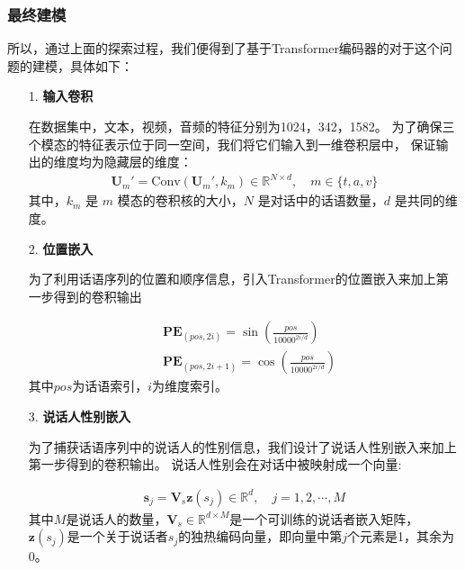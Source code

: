\documentclass[11pt]{article}
\begin{document}
            \subsubsection{最终建模}
            所以，通过上面的探索过程，我们便得到了基于Transformer编码器的对于这个问题的建模，具体如下：
            \begin{enumerate}
                \setlength{\parindent}{2em}

                \item [1. ]\textbf{输入卷积}
                \par 在数据集中，文本，视频，音频的特征分别为1024，342，1582。
                为了确保三个模态的特征表示位于同一空间，我们将它们输入到一维卷积层中，
                保证输出的维度均为隐藏层的维度：
                \begin{align}
                    \textbf{U}_m' = \textrm{Conv}(\textbf{U}_m',k_m) \in \mathbb{R} ^{N \times d},\quad m \in \{t,a,v\}
                \end{align}
                其中，$k_m$ 是 $m$ 模态的卷积核的大小，$N$ 是对话中的话语数量，$d$ 是共同的维度。
                
                \item [2. ]\textbf{位置嵌入}\par
                为了利用话语序列的位置和顺序信息，引入Transformer的位置嵌入来加上第一步得到的卷积输出

                \begin{align}
                    &\textbf{PE}_{(pos, 2i)} = \sin(\frac{pos}{10000^{2i/d}})\\
                    &\textbf{PE}_{(pos, 2i+1)} = \cos(\frac{pos}{10000^{2i/d}})
                \end{align}
                其中$pos$为话语索引，$i$为维度索引。
            
                
                \item [3. ]\textbf{说话人性别嵌入}\par
                为了捕获话语序列中的说话人的性别信息，我们设计了说话人性别嵌入来加上第一步得到的卷积输出。
                说话人性别会在对话中被映射成一个向量:

                \begin{align}
                    \textbf{s}_j = \textbf{V}_s \textbf{z}(s_j) \in \mathbb{R}^d,\quad j = 1, 2, \cdots,M
                \end{align}
                其中$M$是说话人的数量，$\textbf{V}_s \in \mathbb{R}^{d\times M}$是一个可训练的说话者嵌入矩阵，
                $\textbf{z}(s_j)$是一个关于说话者$s_j$的独热编码向量，即向量中第$j$个元素是1，其余为0。


\end{enumerate}
\end{document}
